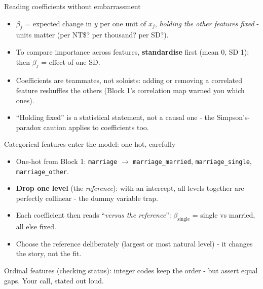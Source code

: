 \documentclass[10pt,aspectratio=169]{beamer}
\begin{document}
\begin{frame}{Reading coefficients without embarrassment}
  \begin{itemize}
    \item $\beta_j$ = expected change in $y$ per \alert{one unit} of $x_j$,
          \emph{holding the other features fixed} - units matter
          (per NT\$? per thousand? per SD?).
    \item To compare importance across features, \textbf{standardise} first
          (mean 0, SD 1): then $\beta_j$ = effect of one SD.
    \item Coefficients are \alert{teammates, not soloists}: adding or removing
          a correlated feature reshuffles the others (Block 1's correlation
          map warned you which ones).
    \item ``Holding fixed'' is a statistical statement, not a causal one -
          the Simpson's-paradox caution applies to coefficients too.
  \end{itemize}
\end{frame}

\begin{frame}{Categorical features enter the model: one-hot, carefully}
  \begin{itemize}\small
    \item One-hot from Block 1: \texttt{marriage} $\to$
          \texttt{marriage\_married}, \texttt{marriage\_single},
          \texttt{marriage\_other}.
    \item \textbf{Drop one level} (the \emph{reference}): with an intercept,
          all levels together are perfectly collinear - the
          \alert{dummy variable trap}.
    \item Each coefficient then reads ``\emph{versus the reference}'':
          $\beta_{\text{single}}$ = single vs married, all else fixed.
    \item Choose the reference deliberately (largest or most natural level) -
          it changes the story, not the fit.
  \end{itemize}
  \vspace{0.5em}
  \begin{center}\small
    Ordinal features (checking status): integer codes keep the order -
    but assert equal gaps. Your call, stated out loud.
  \end{center}
\end{frame}
\end{document}
